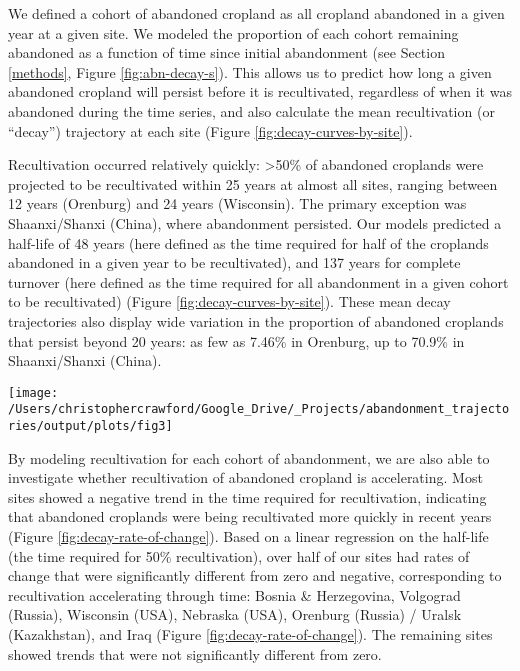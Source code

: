 \documentclass[9pt,twocolumn,twoside,]{pnas-new}
\begin{document}
We defined a cohort of abandoned cropland as all cropland abandoned in a given year at a given site.
We modeled the proportion of each cohort remaining abandoned as a function of time since initial abandonment (see Section \ref{methods}, Figure \ref{fig:abn-decay-s}).
This allows us to predict how long a given abandoned cropland will persist before it is recultivated, regardless of when it was abandoned during the time series, and also calculate the mean recultivation (or ``decay'') trajectory at each site (Figure \ref{fig:decay-curves-by-site}).

Recultivation occurred relatively quickly: \textgreater50\% of abandoned croplands were projected to be recultivated within 25 years at almost all sites, ranging between 12 years (Orenburg) and 24 years (Wisconsin).
The primary exception was Shaanxi/Shanxi (China), where abandonment persisted.
Our models predicted a half-life of 48 years (here defined as the time required for half of the croplands abandoned in a given year to be recultivated), and 137 years for complete turnover (here defined as the time required for all abandonment in a given cohort to be recultivated) (Figure \ref{fig:decay-curves-by-site}).
These mean decay trajectories also display wide variation in the proportion of abandoned croplands that persist beyond 20 years: as few as 7.46\% in Orenburg, up to 70.9\% in Shaanxi/Shanxi (China).



\begin{figure*}
\texttt{[image: /Users/christophercrawford/Google\_Drive/\_Projects/abandonment\_trajectories/output/plots/fig3]} \caption{Mean decay trajectories for each site, based on a linear model predicting the proportion of abandoned land remaining abandoned as a function of time (including a linear and a logarithmic term of time). The function describing each site's mean trajectory is calculated by taking the mean of each time coefficient across all cohorts of abandonment at each site.}\label{fig:decay-curves-by-site}
\end{figure*}

By modeling recultivation for each cohort of abandonment, we are also able to investigate whether recultivation of abandoned cropland is accelerating.
Most sites showed a negative trend in the time required for recultivation, indicating that abandoned croplands were being recultivated more quickly in recent years (Figure \ref{fig:decay-rate-of-change}).
Based on a linear regression on the half-life (the time required for 50\% recultivation), over half of our sites had rates of change that were significantly different from zero and negative, corresponding to recultivation accelerating through time: Bosnia \& Herzegovina, Volgograd (Russia), Wisconsin (USA), Nebraska (USA), Orenburg (Russia) / Uralsk (Kazakhstan), and Iraq (Figure \ref{fig:decay-rate-of-change}).
The remaining sites showed trends that were not significantly different from zero.
\end{document}
